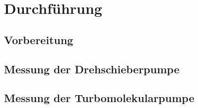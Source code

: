 \section{Durchführung}
\label{sec:Durchführung}

\subsection{Vorbereitung}
\label{sec:vorbereitung}

\subsection{Messung der Drehschieberpumpe}
\label{sec:messungDreh}

\subsection{Messung der Turbomolekularpumpe}
\label{sec:messungTurbo}